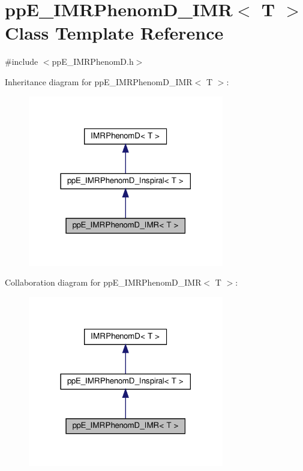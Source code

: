 \hypertarget{classppE__IMRPhenomD__IMR}{}\section{pp\+E\+\_\+\+I\+M\+R\+Phenom\+D\+\_\+\+I\+MR$<$ T $>$ Class Template Reference}
\label{classppE__IMRPhenomD__IMR}


{\ttfamily \#include $<$pp\+E\+\_\+\+I\+M\+R\+Phenom\+D.\+h$>$}



Inheritance diagram for pp\+E\+\_\+\+I\+M\+R\+Phenom\+D\+\_\+\+I\+MR$<$ T $>$\+:\nopagebreak
\begin{figure}[H]
\begin{center}
\leavevmode
\includegraphics[width=242pt]{classppE__IMRPhenomD__IMR__inherit__graph}
\end{center}
\end{figure}


Collaboration diagram for pp\+E\+\_\+\+I\+M\+R\+Phenom\+D\+\_\+\+I\+MR$<$ T $>$\+:\nopagebreak
\begin{figure}[H]
\begin{center}
\leavevmode
\includegraphics[width=242pt]{classppE__IMRPhenomD__IMR__coll__graph}
\end{center}
\end{figure}
